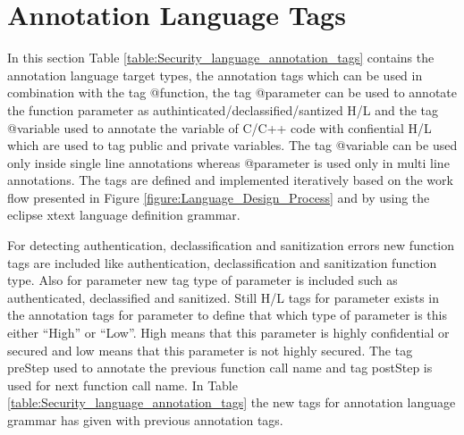 \section{Annotation Language Tags}
In this section Table \ref{table:Security_language_annotation_tags} contains the annotation language
target types, the annotation tags which can be used in
combination with the tag @function, the tag
@parameter can be used to annotate the function parameter as authinticated/declassified/santized H/L and the tag @variable used to annotate the variable of C/C++ code with confiential H/L which are used to tag public and private variables. The tag @variable can be used only inside single line annotations whereas @parameter is used only in multi line annotations. The tags are defined and implemented iteratively based on the work flow presented in Figure \ref{figure:Language_Design_Process} and by using the eclipse xtext \cite{ref_17_xtext:grammar} language
definition grammar.

For detecting authentication, declassification and sanitization errors new function tags are included like authentication, declassification and sanitization function type. Also for parameter new tag type of parameter is included such as authenticated, declassified and sanitized. Still H/L tags for parameter exists in the annotation tags for parameter to define that which type of parameter is this either \enquote{High} or \enquote{Low}. High means that this parameter is highly confidential or secured and low means that this parameter is not highly secured. The tag preStep used to annotate the previous function call name and tag postStep is used for next function call name. In Table \ref{table:Security_language_annotation_tags} the new tags for annotation language grammar has given with previous \cite{ref_108_paul2015infoflow} annotation tags. 

